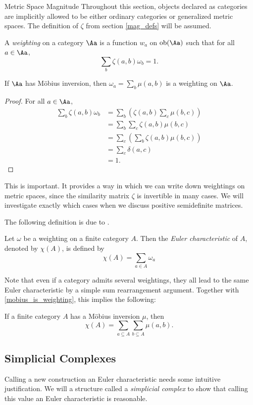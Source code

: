 \documentclass[12pt]{pom_thesis}
\DeclareMathOperator{\obj}{ob}
\begin{document}
\begin{chapter}{Metric Space Magnitude}
Throughout this section, objects declared as categories are implicitly allowed to be either ordinary categories or generalized metric spaces. The definition of $\zeta$ from section \ref{mag_defs} will be assumed.

\begin{defn}
A \emph{weighting} on a category $\Aa$ is a function $w_a$ on $\obj(\Aa)$ such that for all $a \in \Aa$,
\[
\sum_b \zeta(a,b)\omega_b = 1.
\]
\end{defn}

\begin{lemma}
\label{mobius_is_weighting}
If $\Aa$ has M\"obius inversion, then $\omega_a = \sum_b \mu(a,b)$ is a weighting on $\Aa$.
\end{lemma}
\begin{proof} For all $a \in \Aa$,
\begin{align*}
\sum_b \zeta(a,b)\omega_b &= \sum_b\left( \zeta(a,b)\sum_c \mu(b,c)\right)\\
&=\sum_b\sum_c\zeta(a,b)\mu(b,c)\\
&=\sum_c\left(\sum_b\zeta(a,b)\mu(b,c)\right)\\
&=\sum_c \delta(a,c)\\
&=1.
\end{align*}
\end{proof}

This is important. It provides a way in which we can write down weightings on metric spaces, since the similarity matrix $\zeta$ is invertible in many cases. We will investigate exactly which cases when we discuss positive semidefinite matrices.

The following definition is due to \cite{Lein1}.
\begin{defn}
Let $\omega$ be a weighting on a finite category $A$. Then the \emph{Euler characteristic} of $A$, denoted by $\chi(A)$, is defined by
\[
\chi(A) = \sum_{a \in A} \omega_a
\]
\end{defn}
Note that even if a category admits several weightings, they all lead to the same Euler characteristic by a simple sum rearrangement argument. Together with \ref{mobius_is_weighting}, this implies the following:
\begin{cor}
If a finite category $A$ has a M\"obius inversion $\mu$, then
\[\chi(A) = \sum_{a \subseteq A} \sum_{b \subseteq A} \mu(a, b).
\]
\end{cor}

\subsection{Simplicial Complexes}
Calling a new construction an Euler characteristic needs some intuitive justification. We will a structure called a \textit{simplicial complex} to show that calling this value an Euler characteristic is reasonable. 


\end{chapter}
\end{document}
